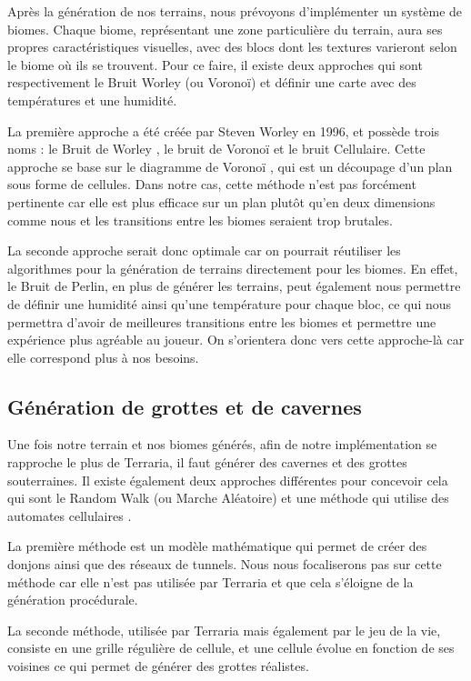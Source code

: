 \documentclass{article}
\begin{document}
Après la génération de nos terrains, nous prévoyons d'implémenter un système de biomes. Chaque biome, représentant une zone particulière du terrain, aura ses propres caractéristiques visuelles, avec des blocs dont les textures varieront selon le biome où ils se trouvent. Pour ce faire, il existe deux approches qui sont respectivement le Bruit Worley (ou Voronoï) et définir une carte avec des températures et une humidité.\par
La première approche a été créée par Steven Worley en 1996, et possède trois noms : le Bruit de Worley \cite{worley_noise}, le bruit de Voronoï et le bruit Cellulaire. Cette approche se base sur le diagramme de Voronoï \cite{voronoi_diagram}, qui est un découpage d'un plan sous forme de cellules. Dans notre cas, cette méthode n'est pas forcément pertinente car elle est plus efficace sur un plan plutôt qu'en deux dimensions comme nous et les transitions entre les biomes seraient trop brutales.\par
La seconde approche serait donc optimale car on pourrait réutiliser les algorithmes pour la génération de terrains directement pour les biomes. En effet, le Bruit de Perlin, en plus de générer les terrains, peut également nous permettre de définir une humidité ainsi qu'une température pour chaque bloc, ce qui nous permettra d'avoir de meilleures transitions entre les biomes et permettre une expérience plus agréable au joueur. On s'orientera donc vers cette approche-là car elle correspond plus à nos besoins. 

\subsection{Génération de grottes et de cavernes}

Une fois notre terrain et nos biomes générés, afin de notre implémentation se rapproche le plus de Terraria, il faut générer des cavernes et des grottes souterraines. Il existe également deux approches différentes pour concevoir cela qui sont le Random Walk \cite{random_walk} (ou Marche Aléatoire) et une méthode qui utilise des automates cellulaires \cite{automate_cellulaire}.\par
La première méthode est un modèle mathématique qui permet de créer des donjons ainsi que des réseaux de tunnels. Nous nous focaliserons pas sur cette méthode car elle n'est pas utilisée par Terraria et que cela s'éloigne de la génération procédurale.\par 
La seconde méthode, utilisée par Terraria mais également par le jeu de la vie, consiste en une grille régulière de cellule, et une cellule évolue en fonction de ses voisines ce qui permet de générer des grottes réalistes.
\end{document}
